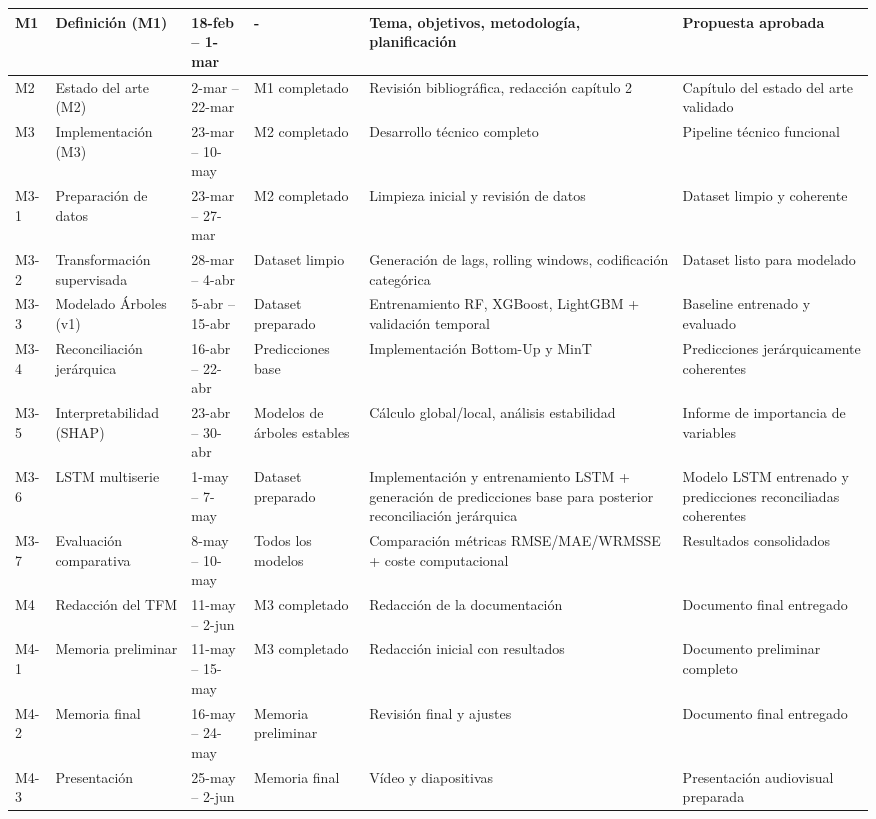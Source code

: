\documentclass[IB,BIB]{TFUOC}%
\begin{document}
\begin{longtable}{p{1cm} !{\vrule width 0.1pt} p{2.85cm} !{\vrule width 0.1pt} p{1.7cm} !{\vrule width 0.1pt} p{2cm} !{\vrule width 0.1pt} p{4.5cm} !{\vrule width 0.1pt} p{4cm}}
M1 & Definición (M1) & 18-feb -- 1-mar & - & Tema, objetivos, metodología, planificación & Propuesta aprobada \\
\midrule
\midrule
M2 & Estado del arte (M2) & 2-mar -- 22-mar & M1 completado & Revisión bibliográfica, redacción capítulo 2 & Capítulo del estado del arte validado \\
\midrule
\midrule
M3 & Implementación (M3) & 23-mar -- 10-may & M2 completado & Desarrollo técnico completo & Pipeline técnico funcional \\
\midrule
M3-1 & Preparación de datos & 23-mar -- 27-mar & M2 completado & Limpieza inicial y revisión de datos & Dataset limpio y coherente \\
\midrule
M3-2 & Transformación supervisada & 28-mar -- 4-abr & Dataset limpio & Generación de lags, rolling windows, codificación categórica & Dataset listo para modelado \\
\midrule
M3-3 & Modelado Árboles (v1) & 5-abr -- 15-abr & Dataset preparado & Entrenamiento RF, XGBoost, LightGBM + validación temporal & Baseline entrenado y evaluado \\
\midrule
M3-4 & Reconciliación jerárquica & 16-abr -- 22-abr & Predicciones base & Implementación Bottom-Up y MinT & Predicciones jerárquicamente coherentes \\
\midrule
M3-5 & Interpretabilidad (SHAP) & 23-abr -- 30-abr & Modelos de árboles estables & Cálculo global/local, análisis estabilidad & Informe de importancia de variables \\
\midrule
M3-6 & LSTM multiserie & 1-may -- 7-may & Dataset preparado & Implementación y entrenamiento LSTM + generación de predicciones base para posterior reconciliación jerárquica & Modelo LSTM entrenado y predicciones reconciliadas coherentes \\
\midrule
M3-7 & Evaluación comparativa & 8-may -- 10-may & Todos los modelos & Comparación métricas RMSE/MAE/WRMSSE + coste computacional & Resultados consolidados \\
\midrule
\midrule
M4 & Redacción del TFM & 11-may -- 2-jun & M3 completado & Redacción de la documentación & Documento final entregado \\
\midrule
M4-1 & Memoria preliminar & 11-may -- 15-may & M3 completado & Redacción inicial con resultados & Documento preliminar completo \\
\midrule
M4-2 & Memoria final & 16-may -- 24-may & Memoria preliminar & Revisión final y ajustes & Documento final entregado \\
\midrule
M4-3 & Presentación & 25-may -- 2-jun & Memoria final & Vídeo y diapositivas & Presentación audiovisual preparada \\

\end{longtable}
\end{document}
